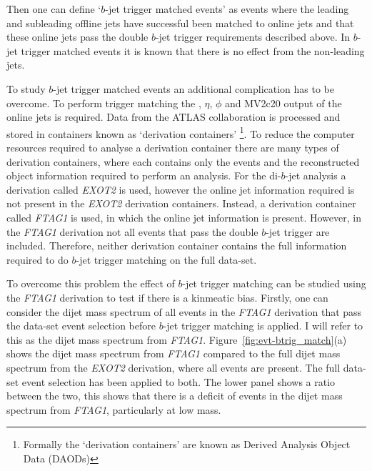 Then one can define `$b$-jet trigger matched events' as events where
the leading and subleading offline jets have successful been matched to online jets
and that these online jets pass the double $b$-jet trigger requirements described above.
In $b$-jet trigger matched events it is known that there is no effect from the non-leading jets.

To study $b$-jet trigger matched events an additional complication has to be overcome.
To perform trigger matching the \pT, $\eta$, $\phi$ and MV2c20 output of the online jets is required.
Data from the ATLAS collaboration is processed and stored in containers known as `derivation containers'
\footnote{Formally the `derivation containers' are known as Derived Analysis Object Data (DAODs)}.
To reduce the computer resources required to analyse a derivation container
there are many types of derivation containers,
where each contains only the events and the reconstructed object information required to perform an analysis.
For the di-$b$-jet analysis a derivation called \textit{EXOT2} is used,
however the online jet information required is not present in the \textit{EXOT2} derivation containers.
Instead, a derivation container called \textit{FTAG1} is used, in which the online jet information is present.
However, in the \textit{FTAG1} derivation not all events that pass the double $b$-jet trigger are included.
Therefore, neither derivation container contains the full information required to do $b$-jet trigger matching on the full \lm{} data-set.

To overcome this problem the effect of $b$-jet trigger matching can be studied using the \textit{FTAG1} derivation
to test if there is a kinmeatic bias.
Firstly, one can consider the dijet mass spectrum of all events in the \textit{FTAG1} derivation
that pass the \lm{} data-set event selection before $b$-jet trigger matching is applied.
I will refer to this as the dijet mass spectrum from \textit{FTAG1}.
Figure~\ref{fig:evt-btrig_match}(a) shows the dijet mass spectrum from \textit{FTAG1}
compared to the full dijet mass spectrum from the \textit{EXOT2} derivation, where all events are present.
The full \lm{} data-set event selection has been applied to both.
The lower panel shows a ratio between the two, this shows that there is a deficit of events
in the dijet mass spectrum from \textit{FTAG1}, particularly at low mass.


